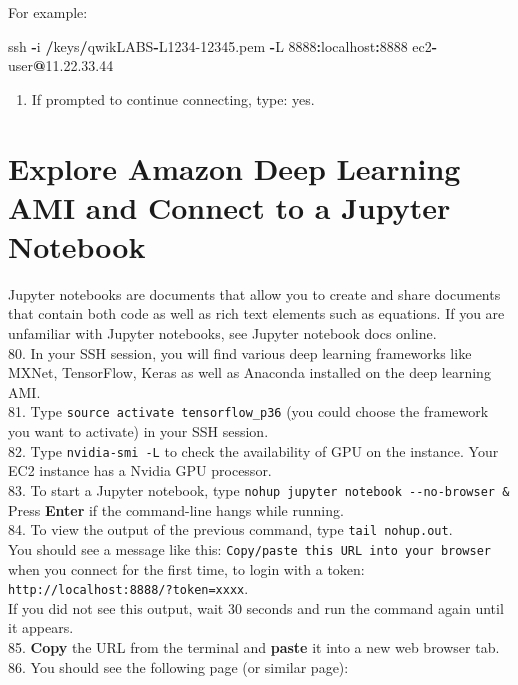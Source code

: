 \documentclass[]{book}
\newenvironment{Shaded}{\begin{snugshade}}{\end{snugshade}}
\newcommand{\DecValTok}[1]{\textcolor[rgb]{0.00,0.00,0.81}{#1}}
\newcommand{\FloatTok}[1]{\textcolor[rgb]{0.00,0.00,0.81}{#1}}
\newcommand{\OperatorTok}[1]{\textcolor[rgb]{0.81,0.36,0.00}{\textbf{#1}}}
\newcommand{\NormalTok}[1]{#1}
\providecommand{\tightlist}{%
  \setlength{\itemsep}{0pt}\setlength{\parskip}{0pt}}
\begin{document}
For example:

\begin{Shaded}
\begin{Highlighting}[]
\NormalTok{ssh }\OperatorTok{-}\NormalTok{i }\OperatorTok{/}\NormalTok{keys}\OperatorTok{/}\NormalTok{qwikLABS}\OperatorTok{-}\NormalTok{L1234}\FloatTok{-12345.}\NormalTok{pem }\OperatorTok{-}\NormalTok{L }\DecValTok{8888}\OperatorTok{:}\NormalTok{localhost}\OperatorTok{:}\DecValTok{8888} 
\NormalTok{ec2}\OperatorTok{-}\NormalTok{user}\OperatorTok{@}\DecValTok{11}\NormalTok{.}\DecValTok{22}\NormalTok{.}\FloatTok{33.44}
\end{Highlighting}
\end{Shaded}

\begin{enumerate}
\def\labelenumi{\arabic{enumi}.}
\setcounter{enumi}{78}
\tightlist
\item
  If prompted to continue connecting, type: yes.
\end{enumerate}

\hypertarget{explore-amazon-deep-learning-ami-and-connect-to-a-jupyter-notebook}{%
\chapter{Explore Amazon Deep Learning AMI and Connect to a Jupyter Notebook}\label{explore-amazon-deep-learning-ami-and-connect-to-a-jupyter-notebook}}

Jupyter notebooks are documents that allow you to create and share documents that contain both code as well as rich text elements such as equations. If you are unfamiliar with Jupyter notebooks, see Jupyter notebook docs online.\\
80. In your SSH session, you will find various deep learning frameworks like MXNet, TensorFlow, Keras as well as Anaconda installed on the deep learning AMI.\\
81. Type \texttt{source\ activate\ tensorflow\_p36} (you could choose the framework you want to activate) in your SSH session.\\
82. Type \texttt{nvidia-smi\ -L} to check the availability of GPU on the instance. Your EC2 instance has a Nvidia GPU processor.\\
83. To start a Jupyter notebook, type \texttt{nohup\ jupyter\ notebook\ -\/-no-browser\ \&}\\
Press \textbf{Enter} if the command-line hangs while running.\\
84. To view the output of the previous command, type \texttt{tail\ nohup.out}.\\
You should see a message like this: \texttt{Copy/paste\ this\ URL\ into\ your\ browser} when you connect for the first time, to login with a token: \texttt{http://localhost:8888/?token=xxxx}.\\
If you did not see this output, wait 30 seconds and run the command again until it appears.\\
85. \textbf{Copy} the URL from the terminal and \textbf{paste} it into a new web browser tab.\\
86. You should see the following page (or similar page):
\end{document}
